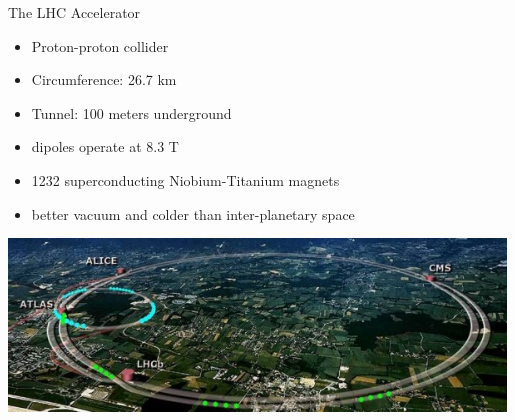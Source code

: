


\begin{frame}{The LHC Accelerator}
  \begin{center}
    \begin{itemize}
    \item
      Proton-proton collider
    \item
      Circumference: 26.7 km
    \item
      Tunnel: 100 meters underground
    \item
      dipoles operate at 8.3 T
    \item
      1232 superconducting Niobium-Titanium magnets
    \item
      better vacuum and colder than inter-planetary  space
    \end{itemize}
  
\vspace{.5em}
\includegraphics[width=0.99\textwidth]{images/lhc-sim-600x209.jpg}

  \end{center}
\end{frame}





